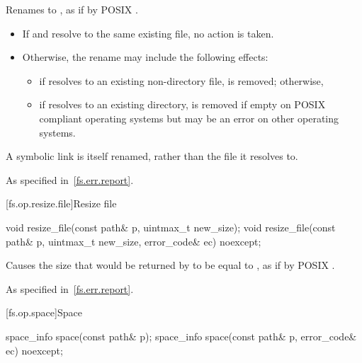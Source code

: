 \begin{itemdescr}
\pnum
\effects
Renames  to , as if by
  POSIX .

\begin{note}
\begin{itemize}
\item If  and  resolve to the same existing file,
   no action is taken.
\item Otherwise, the rename may include the following effects:
\begin{itemize}
\item if  resolves to an existing non-directory file,
     is removed; otherwise,
\item if  resolves to an existing directory,
     is removed if empty on POSIX compliant operating systems
    but may be an error on other operating systems.
\end{itemize}
\end{itemize}
A symbolic link is itself renamed, rather than the file it resolves to.
\end{note}

\pnum
\throws
As specified in~\ref{fs.err.report}.
\end{itemdescr}


[fs.op.resize.file]{Resize file}

%
\begin{itemdecl}
void resize_file(const path& p, uintmax_t new_size);
void resize_file(const path& p, uintmax_t new_size, error_code& ec) noexcept;
\end{itemdecl}

\begin{itemdescr}
\pnum
\effects
Causes the size that would be returned by  to be
equal to , as if by POSIX .

\pnum
\throws
As specified in~\ref{fs.err.report}.
\end{itemdescr}


[fs.op.space]{Space}

%
\begin{itemdecl}
space_info space(const path& p);
space_info space(const path& p, error_code& ec) noexcept;
\end{itemdecl}

